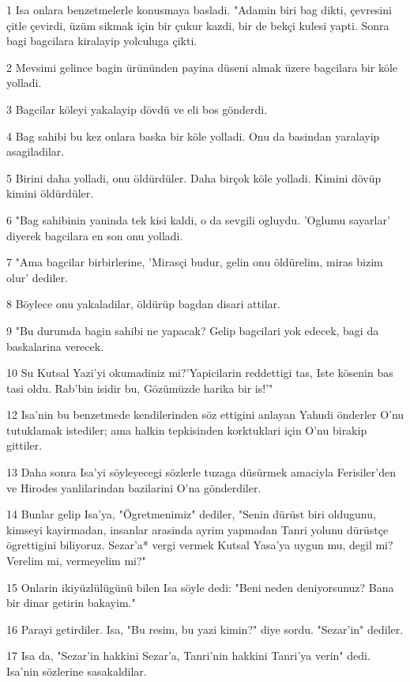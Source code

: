 \par 1 Isa onlara benzetmelerle konusmaya basladi. "Adamin biri bag dikti, çevresini çitle çevirdi, üzüm sikmak için bir çukur kazdi, bir de bekçi kulesi yapti. Sonra bagi bagcilara kiralayip yolculuga çikti.
\par 2 Mevsimi gelince bagin ürününden payina düseni almak üzere bagcilara bir köle yolladi.
\par 3 Bagcilar köleyi yakalayip dövdü ve eli bos gönderdi.
\par 4 Bag sahibi bu kez onlara baska bir köle yolladi. Onu da basindan yaralayip asagiladilar.
\par 5 Birini daha yolladi, onu öldürdüler. Daha birçok köle yolladi. Kimini dövüp kimini öldürdüler.
\par 6 "Bag sahibinin yaninda tek kisi kaldi, o da sevgili ogluydu. 'Oglumu sayarlar' diyerek bagcilara en son onu yolladi.
\par 7 "Ama bagcilar birbirlerine, 'Mirasçi budur, gelin onu öldürelim, miras bizim olur' dediler.
\par 8 Böylece onu yakaladilar, öldürüp bagdan disari attilar.
\par 9 "Bu durumda bagin sahibi ne yapacak? Gelip bagcilari yok edecek, bagi da baskalarina verecek.
\par 10 Su Kutsal Yazi'yi okumadiniz mi?'Yapicilarin reddettigi tas, Iste kösenin bas tasi oldu. Rab'bin isidir bu, Gözümüzde harika bir is!'"
\par 12 Isa'nin bu benzetmede kendilerinden söz ettigini anlayan Yahudi önderler O'nu tutuklamak istediler; ama halkin tepkisinden korktuklari için O'nu birakip gittiler.
\par 13 Daha sonra Isa'yi söyleyecegi sözlerle tuzaga düsürmek amaciyla Ferisiler'den ve Hirodes yanlilarindan bazilarini O'na gönderdiler.
\par 14 Bunlar gelip Isa'ya, "Ögretmenimiz" dediler, "Senin dürüst biri oldugunu, kimseyi kayirmadan, insanlar arasinda ayrim yapmadan Tanri yolunu dürüstçe ögrettigini biliyoruz. Sezar'a* vergi vermek Kutsal Yasa'ya uygun mu, degil mi? Verelim mi, vermeyelim mi?"
\par 15 Onlarin ikiyüzlülügünü bilen Isa söyle dedi: "Beni neden deniyorsunuz? Bana bir dinar getirin bakayim."
\par 16 Parayi getirdiler. Isa, "Bu resim, bu yazi kimin?" diye sordu. "Sezar'in" dediler.
\par 17 Isa da, "Sezar'in hakkini Sezar'a, Tanri'nin hakkini Tanri'ya verin" dedi. Isa'nin sözlerine sasakaldilar.

